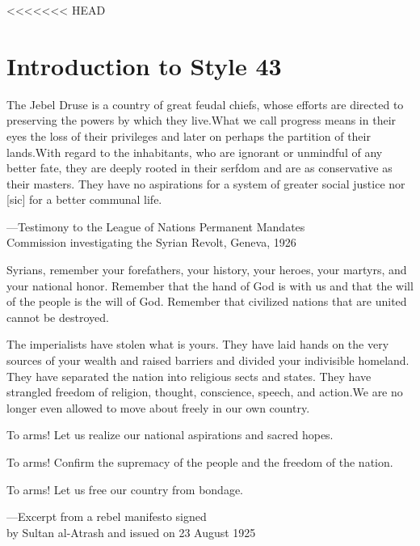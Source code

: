 <<<<<<< HEAD






\chapter{Introduction to Style 43}

\epigraph{The Jebel Druse is a country of great feudal chiefs, whose efforts are
directed to preserving the powers by which they live.What we call
progress means in their eyes the loss of their privileges and later on
perhaps the partition of their lands.With regard to the inhabitants,
who are ignorant or unmindful of any better fate, they are deeply rooted
in their serfdom and are as conservative as their masters. They have no
aspirations for a system of greater social justice nor [sic] for a better
communal life.}{---Testimony to the League of Nations Permanent Mandates\\
Commission investigating the Syrian Revolt, Geneva, 1926}

\epigraph{Syrians, remember your forefathers, your history, your heroes, your
martyrs, and your national honor. Remember that the hand of God is
with us and that the will of the people is the will of God. Remember
that civilized nations that are united cannot be destroyed.

The imperialists have stolen what is yours. They have laid hands on
the very sources of your wealth and raised barriers and divided your
indivisible homeland. They have separated the nation into religious
sects and states. They have strangled freedom of religion, thought,
conscience, speech, and action.We are no longer even allowed to move
about freely in our own country.

To arms! Let us realize our national aspirations and sacred hopes.

To arms! Confirm the supremacy of the people and the freedom of
the nation.

To arms! Let us free our country from bondage.}{---Excerpt from a rebel manifesto signed\\ by Sultan
al-Atrash and issued on 23 August 1925}

